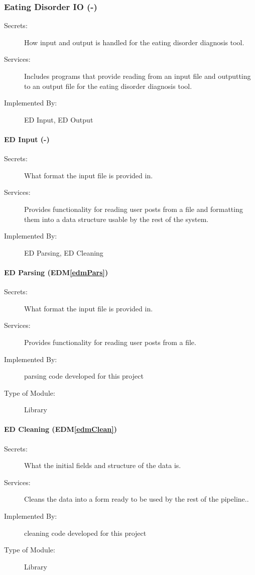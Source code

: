 \documentclass[12pt, titlepage]{article}
\newcommand{\edmref}[1]{EDM\ref{#1}}
\begin{document}
\subsubsection{Eating Disorder IO (-)}
\begin{description}
\item[Secrets:]How input and output is handled for the eating disorder diagnosis tool.
\item[Services:]Includes programs that provide reading from an input file and outputting to an output file for the eating disorder diagnosis tool.
\item[Implemented By:] ED Input, ED Output
\end{description}

\paragraph{ED Input (-)}
\begin{description}
\item[Secrets:] What format the input file is provided in.
\item[Services:] Provides functionality for reading user posts from a file and formatting them into a data structure usable by the rest of the system.
\item[Implemented By:] ED Parsing, ED Cleaning
\end{description}

\paragraph{ED Parsing (\edmref{edmPars})}
\begin{description}
\item[Secrets:] What format the input file is provided in.
\item[Services:] Provides functionality for reading user posts from a file.
\item[Implemented By:] parsing code developed for this project
\item[Type of Module:] Library
\end{description}

\paragraph{ED Cleaning (\edmref{edmClean})}
\begin{description}
\item[Secrets:] What the initial fields and structure of the data is.
\item[Services:] Cleans the data into a form ready to be used by the rest of the pipeline..
\item[Implemented By:] cleaning code developed for this project
\item[Type of Module:] Library
\end{description}
\end{document}
